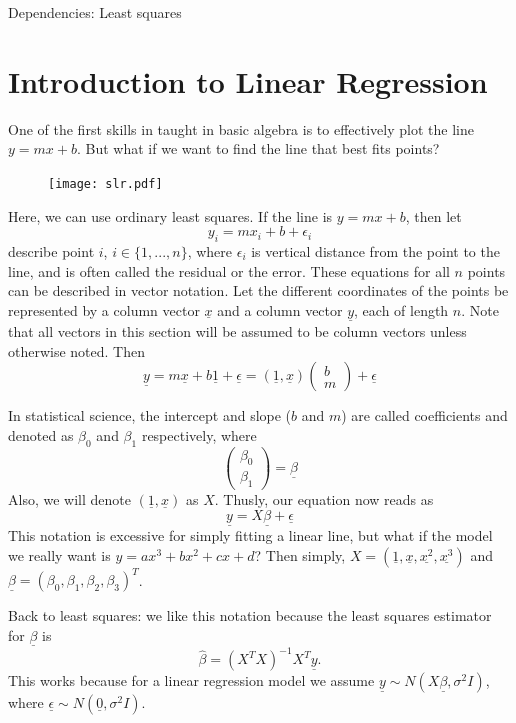 \label{lab:Regression}

Dependencies: Least squares

\section*{Introduction to Linear Regression}
One of the first skills in taught in basic algebra is to effectively plot the line $y=mx+b$. 
But what if we want to find the line that best fits points?

\begin{figure}
\texttt{[image: slr.pdf]}
\end{figure}
Here, we can use ordinary least squares. 
If the line is $y=mx+b$, then let \[y_i = mx_i + b +\epsilon_i\] describe point $i$, $i \in \{1,...,n\}$, where $\epsilon_i$ is vertical distance from the point to the line, and is often called the residual or the error.
These equations for all $n$ points can be described in vector notation.
Let the different coordinates of the points be represented by a column vector $\underline{x}$ and a column vector $\underline{y}$, each of length $n$. 
Note that all vectors in this section will be assumed to be column vectors unless otherwise noted.
Then 
\[\underline{y}=m\underline{x}+b\underline{1}+\underline{\epsilon} = (\underline{1}, \underline{x}) \begin{pmatrix} b \\ m \end{pmatrix} + \underline{\epsilon}\]

In statistical science, the intercept and slope ($b$ and $m$) are called coefficients and denoted as $\beta_0$ and $\beta_1$ respectively, where 
\[\begin{pmatrix} \beta_0 \\ \beta_1 \end{pmatrix} = \underline{\beta}\] 
Also, we will denote $(\underline{1}, \underline{x})$ as $X$.
Thusly, our equation now reads as 
\[\underline{y}=X\underline{\beta}+\underline{\epsilon}\]
This notation is excessive for simply fitting a linear line, but what if the model we really want is $y=ax^3 + bx^2 + cx+d$?
Then simply, $X=(\underline{1},\underline{x},\underline{x^2},\underline{x^3})$ and $\underline{\beta} = (\beta_0, \beta_1, \beta_2, \beta_3)^T$.

Back to least squares: we like this notation because the least squares estimator for $\underline{\beta}$ is $$\hat{\beta} = (X^T X)^{-1} X^T \underline{y}.$$ This works because for a linear regression model we assume $\underline{y} \sim N(X\underline{\beta}, \sigma^2 I)$, where $\underline{\epsilon} \sim N(\underline{0}, \sigma^2 I)$.

